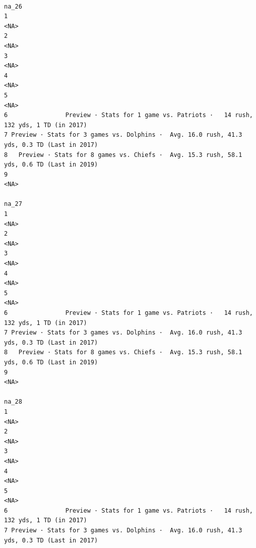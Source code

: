\documentclass[
]{article}
\begin{document}
\begin{verbatim}
                                                                                        na_26
1                                                                                        <NA>
2                                                                                        <NA>
3                                                                                        <NA>
4                                                                                        <NA>
5                                                                                        <NA>
6                Preview · Stats for 1 game vs. Patriots ·   14 rush, 132 yds, 1 TD (in 2017)
7 Preview · Stats for 3 games vs. Dolphins ·  Avg. 16.0 rush, 41.3 yds, 0.3 TD (Last in 2017)
8   Preview · Stats for 8 games vs. Chiefs ·  Avg. 15.3 rush, 58.1 yds, 0.6 TD (Last in 2019)
9                                                                                        <NA>
                                                                                        na_27
1                                                                                        <NA>
2                                                                                        <NA>
3                                                                                        <NA>
4                                                                                        <NA>
5                                                                                        <NA>
6                Preview · Stats for 1 game vs. Patriots ·   14 rush, 132 yds, 1 TD (in 2017)
7 Preview · Stats for 3 games vs. Dolphins ·  Avg. 16.0 rush, 41.3 yds, 0.3 TD (Last in 2017)
8   Preview · Stats for 8 games vs. Chiefs ·  Avg. 15.3 rush, 58.1 yds, 0.6 TD (Last in 2019)
9                                                                                        <NA>
                                                                                        na_28
1                                                                                        <NA>
2                                                                                        <NA>
3                                                                                        <NA>
4                                                                                        <NA>
5                                                                                        <NA>
6                Preview · Stats for 1 game vs. Patriots ·   14 rush, 132 yds, 1 TD (in 2017)
7 Preview · Stats for 3 games vs. Dolphins ·  Avg. 16.0 rush, 41.3 yds, 0.3 TD (Last in 2017)

\end{verbatim}
\end{document}
